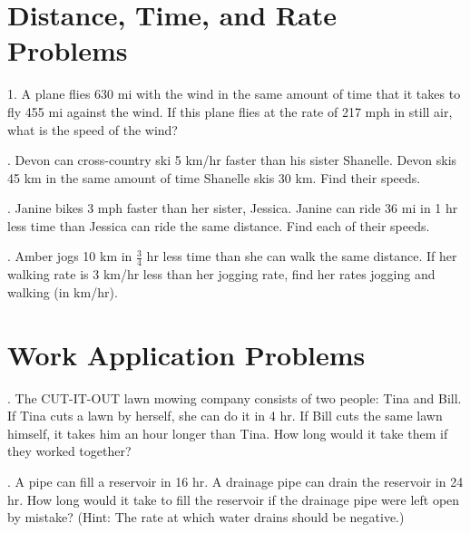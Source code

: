 \documentclass[12pt]{article}
\begin{document}
\section{Distance, Time, and Rate Problems}

\vspace{1.5em}

1. A plane flies 630 mi with the wind in the same amount of time that it takes to fly 455 mi against the wind. If this plane flies at the rate of 217 mph in still air, what is the speed of the wind?
\vspace{12em}

. Devon can cross-country ski 5 km/hr faster than his sister Shanelle. Devon skis 45 km in the same amount of time Shanelle skis 30 km. Find their speeds.

\vspace{12em}
. Janine bikes 3 mph faster than her sister, Jessica. Janine can ride 36 mi in 1 hr less time than Jessica can ride the same distance. Find each of their speeds.

\vspace{12em}
. Amber jogs 10 km in $\frac{3}{4} $ hr less time than she can walk the same distance. If her walking rate is 3 km/hr less than her jogging rate, find her rates jogging and walking (in km/hr).

\vspace{12em}
\section{Work Application Problems}
\vspace{1.5em}
. The CUT-IT-OUT lawn mowing company consists of two people: Tina and Bill. If Tina cuts a lawn by herself, she can do it in 4 hr. If Bill cuts the same lawn himself, it takes him an hour longer than Tina. How long would it take them if they worked together?

\vspace{12em}

. A pipe can fill a reservoir in 16 hr. A drainage pipe can drain the reservoir in 24 hr. How long would it take to fill the reservoir if the drainage pipe were left open by mistake? (Hint: The rate at which water drains should be
negative.)
\end{document}
